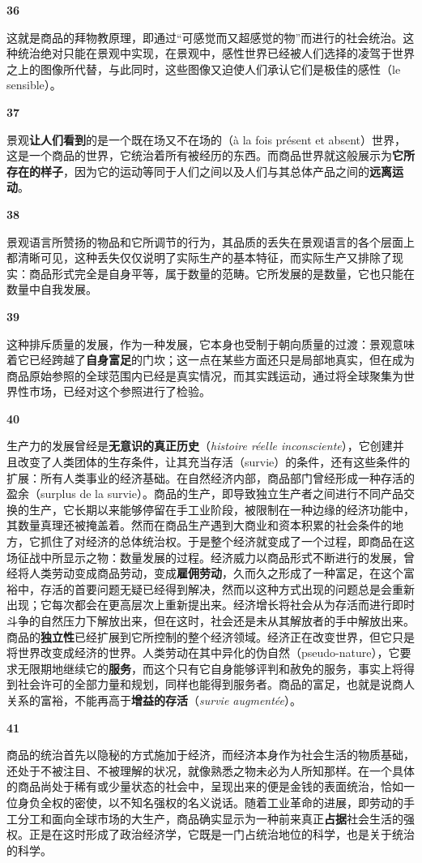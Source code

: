 \documentclass[fontset=fandol, a4paper, 12pt, openright]{ctexbook}
\makeatletter
\newcommand{\thesis}[1]{%
    \par\vspace{1.5em}%
    {\centering \textbf{\Large #1}\par}%
    \nobreak\vspace{0.5em}\nobreak
    \@afterindenttrue %
    \@afterheading    %
}
\makeatother
\begin{document}
\thesis{36}
这就是商品的拜物教原理，即通过“可感觉而又超感觉的物”而进行的社会统治。这种统治绝对只能在景观中实现，在景观中，感性世界已经被人们选择的凌驾于世界之上的图像所代替，与此同时，这些图像又迫使人们承认它们是极佳的感性（le sensible）。

\thesis{37}
景观\textbf{让人们看到}的是一个既在场又不在场的（à la fois présent et absent）世界，这是一个商品的世界，它统治着所有被经历的东西。而商品世界就这般展示为\textbf{它所存在的样子}，因为它的运动等同于人们之间以及人们与其总体产品之间的\textbf{远离运动}。

\thesis{38}
景观语言所赞扬的物品和它所调节的行为，其品质的丢失在景观语言的各个层面上都清晰可见，这种丢失仅仅说明了实际生产的基本特征，而实际生产又排除了现实：商品形式完全是自身平等，属于数量的范畴。它所发展的是数量，它也只能在数量中自我发展。

\thesis{39}
这种排斥质量的发展，作为一种发展，它本身也受制于朝向质量的过渡：景观意味着它已经跨越了\textbf{自身富足}的门坎；这一点在某些方面还只是局部地真实，但在成为商品原始参照的全球范围内已经是真实情况，而其实践运动，通过将全球聚集为世界性市场，已经对这个参照进行了检验。

\thesis{40}
生产力的发展曾经是\textbf{无意识的真正历史}（\textit{histoire réelle inconsciente}），它创建并且改变了人类团体的生存条件，让其充当存活（survie）的条件，还有这些条件的扩展：所有人类事业的经济基础。在自然经济内部，商品部门曾经形成一种存活的盈余（surplus de la survie）。商品的生产，即导致独立生产者之间进行不同产品交换的生产，它长期以来能够停留在手工业阶段，被限制在一种边缘的经济功能中，其数量真理还被掩盖着。然而在商品生产遇到大商业和资本积累的社会条件的地方，它抓住了对经济的总体统治权。于是整个经济就变成了一个过程，即商品在这场征战中所显示之物：数量发展的过程。经济威力以商品形式不断进行的发展，曾经将人类劳动变成商品劳动，变成\textbf{雇佣劳动}，久而久之形成了一种富足，在这个富裕中，存活的首要问题无疑已经得到解决，然而以这种方式出现的问题总是会重新出现；它每次都会在更高层次上重新提出来。经济增长将社会从为存活而进行即时斗争的自然压力下解放出来，但在这时，社会还是未从其解放者的手中解放出来。商品的\textbf{独立性}已经扩展到它所控制的整个经济领域。经济正在改变世界，但它只是将世界改变成经济的世界。人类劳动在其中异化的伪自然（pseudo-nature），它要求无限期地继续它的\textbf{服务}，而这个只有它自身能够评判和赦免的服务，事实上将得到社会许可的全部力量和规划，同样也能得到服务者。商品的富足，也就是说商人关系的富裕，不能再高于\textbf{增益的存活}（\textit{survie augmentée}）。

\thesis{41}
商品的统治首先以隐秘的方式施加于经济，而经济本身作为社会生活的物质基础，还处于不被注目、不被理解的状况，就像熟悉之物未必为人所知那样。在一个具体的商品尚处于稀有或少量状态的社会中，呈现出来的便是金钱的表面统治，恰如一位身负全权的密使，以不知名强权的名义说话。随着工业革命的进展，即劳动的手工分工和面向全球市场的大生产，商品确实显示为一种前来真正\textbf{占据}社会生活的强权。正是在这时形成了政治经济学，它既是一门占统治地位的科学，也是关于统治的科学。
\end{document}

